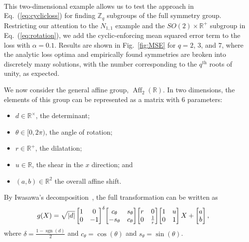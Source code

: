 \documentclass[aps,prx,reprint,preprintnumbers,superscriptaddress,nofootinbib,longbibliography,floatfix]{revtex4-1}
\newcommand{\R}{\mathbb{R}}
\newcommand{\Z}{\mathbb{Z}}
\DeclareRobustCommand{\Fig}[1]{Fig.~\ref{fig:#1}}
\DeclareRobustCommand{\Eq}[1]{Eq.~(\ref{eq:#1})}
\begin{document}
\begin{figure*}[p]
    \centering
    $\quad$
    $\quad$
    \\
    
    \caption{
    Similar to \Fig{AGL2symm} but for the $N_{1,2}$ distribution.
    (i) The determinant-sheer space.  The maxima are indicated by two red stars.
    (ii) The dilatation-rotation angle space.  The maxima are indicated by four red stars.
    (iii) The affine translation space.  The maximum is indicated by a red star at the origin.}
    \label{fig:AGL2asymm}
\end{figure*}



This two-dimensional example allows us to test the approach in \Eq{cyclicloss} for finding $\Z_q$ subgroups of the full symmetry group.
%
Restricting our attention to the $N_{1, 1}$ example and the $SO(2)\times \R^+$ subgroup in \Eq{rotation}, we add the cyclic-enforcing mean squared error term to the loss with $\alpha=0.1$.
%
Results are shown in \Fig{MSE} for $q = 2$, $3$, and $7$, where the analytic loss optima and empirically found symmetries are broken into discretely many solutions, with the number corresponding to the $q^{\textrm{th}}$ roots of unity, as expected.

We now consider the general affine group, $\operatorname{Aff}_2(\R)$.
%
In two dimensions, the elements of this group can be represented as a matrix with 6 parameters:
%
\begin{itemize}
    \item $d\in\R^\times$, the determinant;
    \item $\theta\in [0, 2\pi)$, the angle of rotation;
    \item $r\in \R^+$, the dilatation;
    \item $u\in \R$, the shear in the $x$ direction; and
    \item $(a, b)\in \R^2$ the overall affine shift.
\end{itemize}
%
By Iwasawa's decomposition~\cite{10.2307/1969548}, the full transformation can be written as
%
\begin{align}
&g(X) =\sqrt{|d|}\,\mqty[1&0\\0&-1]^{\delta}\mqty[c_\theta&s_\theta\\-s_\theta&c_\theta]\mqty[r&0\\0&\frac{1}{r}]\mqty[1&u\\0&1]\,X+\mqty[a\\b]\,,
\end{align}
%
where $\delta=\frac{1 - \operatorname{sgn}(d)}{2}$ and $c_\theta=\cos(\theta)$ and $s_\theta=\sin(\theta)$.
\end{document}
